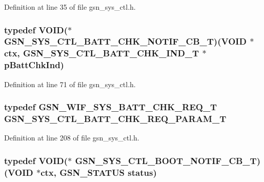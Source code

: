 Definition at line 35 of file gsn\_\-sys\_\-ctl.h.

\hypertarget{a00592_af97ab705a1dd2c6de5dfc45aab9d47fe}{
\subsubsection[{GSN\_\-SYS\_\-CTL\_\-BATT\_\-CHK\_\-NOTIF\_\-CB\_\-T}]{\setlength{\rightskip}{0pt plus 5cm}typedef VOID($\ast$ {\bf GSN\_\-SYS\_\-CTL\_\-BATT\_\-CHK\_\-NOTIF\_\-CB\_\-T})(VOID $\ast$ctx, {\bf GSN\_\-SYS\_\-CTL\_\-BATT\_\-CHK\_\-IND\_\-T} $\ast$pBattChkInd)}}
\label{a00592_af97ab705a1dd2c6de5dfc45aab9d47fe}


Definition at line 71 of file gsn\_\-sys\_\-ctl.h.

\hypertarget{a00592_a8dd20442cad64b6670aa3c7de24c3e9d}{
\subsubsection[{GSN\_\-SYS\_\-CTL\_\-BATT\_\-CHK\_\-REQ\_\-PARAM\_\-T}]{\setlength{\rightskip}{0pt plus 5cm}typedef {\bf GSN\_\-WIF\_\-SYS\_\-BATT\_\-CHK\_\-REQ\_\-T} {\bf GSN\_\-SYS\_\-CTL\_\-BATT\_\-CHK\_\-REQ\_\-PARAM\_\-T}}}
\label{a00592_a8dd20442cad64b6670aa3c7de24c3e9d}


Definition at line 208 of file gsn\_\-sys\_\-ctl.h.

\hypertarget{a00592_a0000f73c2f639831f9499e5106c70b4f}{
\subsubsection[{GSN\_\-SYS\_\-CTL\_\-BOOT\_\-NOTIF\_\-CB\_\-T}]{\setlength{\rightskip}{0pt plus 5cm}typedef VOID($\ast$ {\bf GSN\_\-SYS\_\-CTL\_\-BOOT\_\-NOTIF\_\-CB\_\-T})(VOID $\ast$ctx, {\bf GSN\_\-STATUS} status)}}
\label{a00592_a0000f73c2f639831f9499e5106c70b4f}


